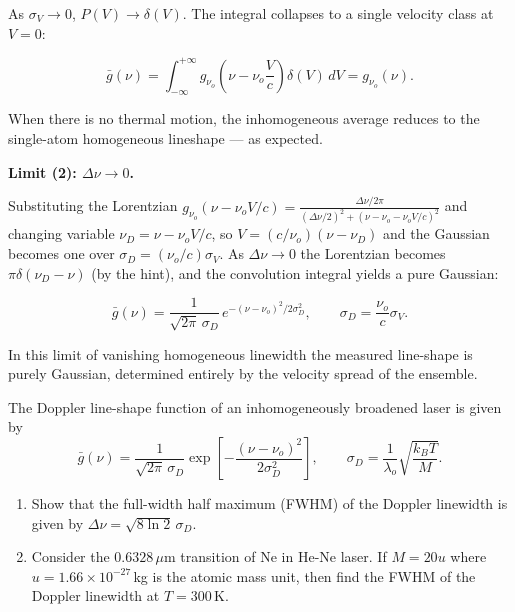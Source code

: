 As $\sigma_V \to 0$, $P(V) \to \delta(V)$. The integral collapses to a single velocity class at $V = 0$:

\begin{equation*}
  \bar{g}(\nu) = \int_{-\infty}^{+\infty} g_{\nu_o}\!\left(\nu - \nu_o\frac{V}{c}\right)\delta(V)\,dV = g_{\nu_o}(\nu).
\end{equation*}

When there is no thermal motion, the inhomogeneous average reduces to the single-atom homogeneous lineshape --- as expected.

\textbf{Limit (2): $\Delta\nu \to 0$.}

Substituting the Lorentzian $g_{\nu_o}\!\left(\nu - \nu_o V/c\right) = \frac{\Delta\nu/2\pi}{(\Delta\nu/2)^2 + (\nu - \nu_o - \nu_oV/c)^2}$ and changing variable $\nu_D = \nu - \nu_o V/c$, so $V = (c/\nu_o)(\nu - \nu_D)$ and the Gaussian becomes one over $\sigma_D = (\nu_o/c)\sigma_V$. As $\Delta\nu \to 0$ the Lorentzian becomes $\pi\delta(\nu_D - \nu)$ (by the hint), and the convolution integral yields a pure Gaussian:

\begin{equation*}
  \boxed{\bar{g}(\nu) = \frac{1}{\sqrt{2\pi}\,\sigma_D}\,
    e^{-(\nu-\nu_o)^{2}/2\sigma_D^{2}}, \qquad \sigma_D = \frac{\nu_o}{c}\sigma_V.}
\end{equation*}

In this limit of vanishing homogeneous linewidth the measured line-shape is purely Gaussian, determined entirely by the velocity spread of the ensemble.


\begin{question}[Question 5]The Doppler line-shape function of an inhomogeneously broadened laser is
given by
\begin{equation*}
  \bar{g}(\nu)=\frac{1}{\sqrt{2\pi}\,\sigma_{D}}
  \exp\!\left[-\frac{(\nu-\nu_{o})^{2}}{2\sigma_{D}^{2}}\right],
  \qquad
  \sigma_{D}=\frac{1}{\lambda_{o}}\sqrt{\frac{k_{B}T}{M}}.
\end{equation*}
\begin{enumerate}[label=(\alph*)]
  \item Show that the full-width half maximum (FWHM) of the Doppler linewidth is given by
        $\Delta\nu=\sqrt{8\ln 2}\,\sigma_{D}$.
  \item Consider the $0.6328\,\mu$m transition of Ne in He-Ne laser. If $M=20u$ where
        $u=1.66\times10^{-27}$\,kg is the atomic mass unit, then find the FWHM of the Doppler
        linewidth at $T=300$\,K.
\end{enumerate}
\end{question}

